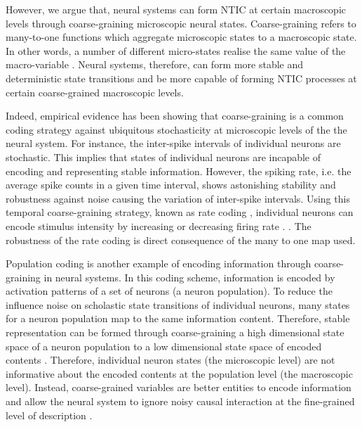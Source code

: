 \documentclass[utf8]{article}
\begin{document}

		However, we argue that, neural systems can form NTIC at certain macroscopic levels through coarse-graining microscopic neural states. Coarse-graining refers to many-to-one functions which aggregate microscopic states to a macroscopic state. In other words, a number of different micro-states realise the same value of the macro-variable \citep{price2007causation}. Neural systems, therefore, can form more stable and deterministic state transitions and be more capable of forming NTIC processes at certain coarse-grained macroscopic levels. 
		
		Indeed, empirical evidence has been showing that coarse-graining is a common coding strategy against ubiquitous stochasticity at microscopic levels of the the neural system. For instance, the inter-spike intervals of individual neurons are stochastic. This implies that states of individual neurons are incapable of encoding and representing stable information. However, the spiking rate, i.e. the average spike counts in a given time interval, shows astonishing stability and robustness against noise causing the variation of inter-spike intervals. Using this temporal coarse-graining strategy, known as rate coding \citep{adrian1926impulses, gerstner2002spiking, maass2001pulsed, panzeri2015neural, stein2005neuronal}, individual neurons can encode stimulus intensity by increasing or decreasing firing rate \citep{kandel2000principles}. \citep{stein2005neuronal}. The robustness of the rate coding is direct consequence of the many to one map used.
		
		Population coding is another example of encoding information through coarse-graining in neural systems. In this coding scheme, information is encoded by activation patterns of a set of neurons (a neuron population). To reduce the influence noise on scholastic state transitions of individual neurons, many states for a neuron population map to the same information content. Therefore, stable representation can be formed through coarse-graining a high dimensional state space of a neuron population to a low dimensional state space of encoded contents \citep{kristan1997population, pouget2000information, binder2009encyclopedia, QuianQuiroga2009}. Therefore, individual neuron states (the microscopic level) are not informative about the encoded contents at the population level (the macroscopic level). Instead, coarse-grained variables are better entities to encode information and allow the neural system to ignore noisy causal interaction at the fine-grained level of description \citep{Woodward2007-WOOCWA}.
		
\end{document}
